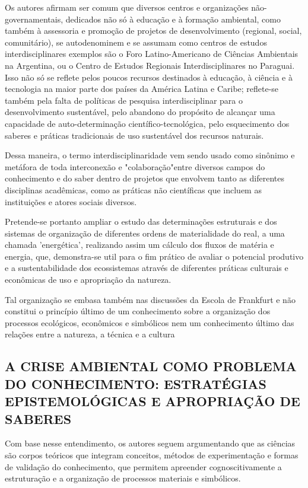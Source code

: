\documentclass[
   article,       %
   12pt,          %
   oneside,       %
   a4paper,       %
   english,       %
   brazil,           %
   sumario=tradicional
   ]{abntex2}
\begin{document}
Os autores afirmam ser comum que diversos centros e organizações não-governamentais, dedicados não só à educação e à formação ambiental, como também à assessoria e promoção de projetos de desenvolvimento (regional, social, comunitário), se autodenominem e se assumam como centros de estudos interdisciplinares exemplos são o Foro Latino-Americano de Ciências Ambientais na Argentina, ou o Centro de Estudos Regionais Interdisciplinares no Paraguai. 
Isso não só se reflete pelos poucos recursos destinados à educação, à ciência e à tecnologia na maior parte dos países da América Latina e Caribe; reflete-se também pela falta de políticas de pesquisa interdisciplinar para o desenvolvimento sustentável, pelo abandono do propósito de alcançar uma capacidade de auto-determinação científico-tecnológica, pelo esquecimento dos saberes e práticas tradicionais de uso sustentável dos recursos naturais. 

Dessa maneira, o termo interdisciplinaridade vem sendo usado como sinônimo e metáfora de toda interconexão e "colaboração"entre diversos campos do conhecimento e do saber dentro de projetos que envolvem tanto as diferentes disciplinas acadêmicas, como as práticas não científicas que incluem as instituições e atores sociais diversos.

Pretende-se portanto ampliar o estudo das determinações estruturais e dos sistemas de organização de diferentes ordens de materialidade do real, a uma chamada ’energética’, realizando assim um cálculo dos fluxos de matéria e energia, que, demonstra-se util para o fim prático de avaliar
o potencial produtivo e a sustentabilidade dos ecossistemas através de diferentes práticas culturais e
econômicas de uso e apropriação da natureza. 

Tal organização se embasa também nas discussões da Escola de Frankfurt e não constitui o princípio último de um conhecimento sobre a organização dos processos ecológicos, econômicos e simbólicos nem um conhecimento último das relações entre a natureza, a técnica e a cultura


\subsection{A CRISE AMBIENTAL COMO PROBLEMA DO CONHECIMENTO:
ESTRATÉGIAS EPISTEMOLÓGICAS E APROPRIAÇÃO DE SABERES}


Com base nesse entendimento, os autores seguem argumentando que as ciências são corpos teóricos que integram conceitos, métodos de experimentação e formas de validação do conhecimento, que permitem apreender cognoscitivamente a estruturação e a organização de processos materiais e simbólicos.
\end{document}
